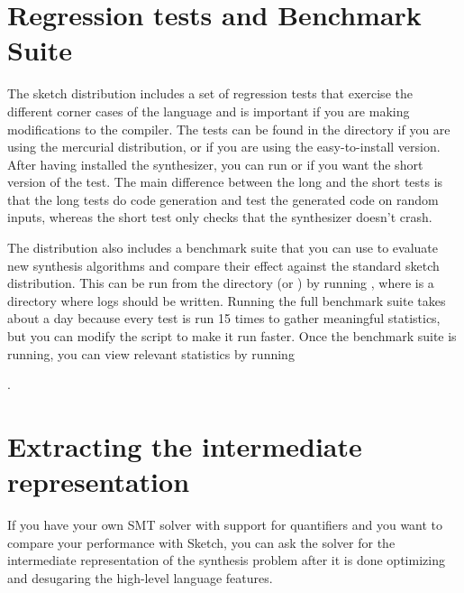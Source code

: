 
\section{Regression tests and Benchmark Suite}

The sketch distribution includes a set of regression tests that exercise the different corner cases of the language and is important if you are making modifications to the compiler. The tests can be found in the directory  if you are using the mercurial distribution, or  if you are using the easy-to-install version. After having installed the synthesizer, you can run  or  if you want the short version of the test. The main difference between the long and the short tests is that the long tests do code generation and test the generated code on random inputs, whereas the short test only checks that the synthesizer doesn't crash.

The distribution also includes a benchmark suite that you can use to evaluate new synthesis algorithms and compare their effect against the standard sketch distribution. This can be run from the  directory (or ) by running , where  is a directory where logs should be written. Running the full benchmark suite takes about a day because every test is run 15 times to gather meaningful statistics, but you can modify the script to make it run faster. Once the benchmark suite is running, you can view relevant statistics by running 

.

\section{Extracting the intermediate representation}
If you have your own SMT solver with support for quantifiers and you want to compare your performance with Sketch, you can ask the solver for the intermediate representation of the synthesis problem after it is done optimizing and desugaring the high-level language features. 


